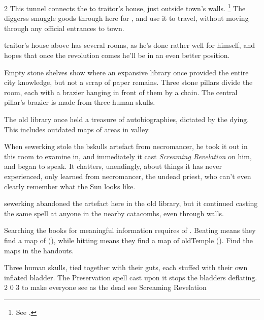 \begin{multicols}{2}
This tunnel connects the  to \gls{traitor}'s house, just outside \gls{town}'s walls.%
\footnote{See  .}
The \glspl{diggers} smuggle goods through here for , and use it to travel, without moving through any official entrances to \gls{town}.

\Gls{traitor}'s house above has several rooms, as he's done rather well for himself, and hopes that once the revolution comes he'll be in an even better position.


\begin{boxtext}
  Empty stone shelves show where an expansive library once provided the entire city knowledge, but not a scrap of paper remains.
  Three stone pillars divide the room, each with a brazier hanging in front of them by a chain.
  The central pillar's brazier is made from three human skulls.
\end{boxtext}

\begin{exampletext}
  The old library once held a treasure of autobiographies, dictated by the dying.
  This includes outdated maps of areas in \gls{valley}.

  When \gls{sewerking} stole the \gls{bskulls} \gls{artefact} from \gls{necromancer}, he took it out in this room to examine in, and immediately it cast \textit{Screaming Revelation} on him, and began to speak.
  It chatters, unendingly, about things it has never experienced, only learned from \gls{necromancer}, the undead priest, who can't even clearly remember what the Sun looks like.

  \Gls{sewerking} abandoned the \gls{artefact} here in the old library, but it continued casting the same spell at anyone in the nearby catacombs, even through walls.

\end{exampletext}

Searching the books for meaningful information requires  of .
Beating \tn[8] means they find a map of  (), while hitting \tn[11] means they find a map of \gls{oldTemple} ().
Find the maps in the handouts.

  {Three human skulls, tied together with their guts, each stuffed with their own inflated bladder.
  The Preservation spell cast upon it stops the bladders deflating.}%
  {2}%
  {0}%
  {3}%
  {to make everyone see as the dead see}%
  {Screaming Revelation}%
  {
    \setcounter{Fate}{3}
    \setcounter{Air}{3}
    \setcounter{Vigilance}{1}
    \setcounter{Academics}{1}
  }%


\end{multicols}
